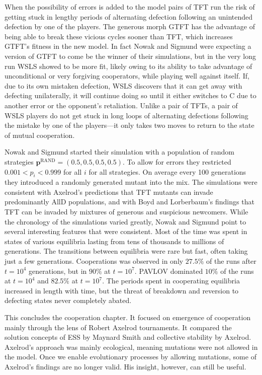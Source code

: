 When the possibility of errors is added to the model pairs of TFT run the risk of getting stuck in lengthy periods of alternating defection following an unintended defection by one of the players. The generous morph GTFT has the advantage of being able to break these vicious cycles sooner than TFT, which increases GTFT's fitness in the new model. In fact Nowak and Sigmund were expecting a version of GTFT to come be the winner of their simulations, but in the very long run WSLS showed to be more fit, likely owing to its ability to take advantage of unconditional or very forgiving cooperators, while playing well against itself. If, due to its own mistaken defection, WSLS discovers that it can get away with defecting unilaterally, it will continue doing so until it either switches to C due to another error or the opponent's retaliation. Unlike a pair of TFTs, a pair of WSLS players do not get stuck in long loops of alternating defections following the mistake by one of the players---it only takes two moves to return to the state of mutual cooperation.

Nowak and Sigmund started their simulation with a population of random strategies $\mathbf{p}^{\textrm{RAND}} = (0.5, 0.5, 0.5, 0.5)$. To allow for errors they restricted $0.001 < p_i < 0.999$ for all $i$ for all strategies. On average every 100 generations they introduced a randomly generated mutant into the mix. The simulations were consistent with Axelrod's predictions that TFT mutants can invade predominantly AllD populations, and with Boyd and Lorberbaum's findings that TFT can be invaded by mixtures of generous and suspicious newcomers. While the chronology of the simulations varied greatly, Nowak and Sigmund point to several interesting features that were consistent. Most of the time was spent in states of various equilibria lasting from tens of thousands to millions of generations. The transitions between equilibria were rare but fast, often taking just a few generations. Cooperations was observed in only $27.5\%$ of the runs after $t = 10^4$ generations, but in $90\%$ at $t=10^7$. PAVLOV dominated $10\%$ of the runs at $t = 10^4$ and $82.5\%$ at $t=10^7$. The periods spent in cooperating equilibria increased in length with time, but the threat of breakdown and reversion to defecting states never completely abated.

This concludes the cooperation chapter. It focused on emergence of cooperation mainly through the lens of Robert Axelrod tournaments. It compared the solution concepts of ESS by Maynard Smith and collective stability by Axelrod. Axelrod's approach was mainly ecological, meaning mutations were not allowed in the model. Once we enable evolutionary processes by allowing mutations, some of Axelrod's findings are no longer valid. His insight, however, can still be useful.

